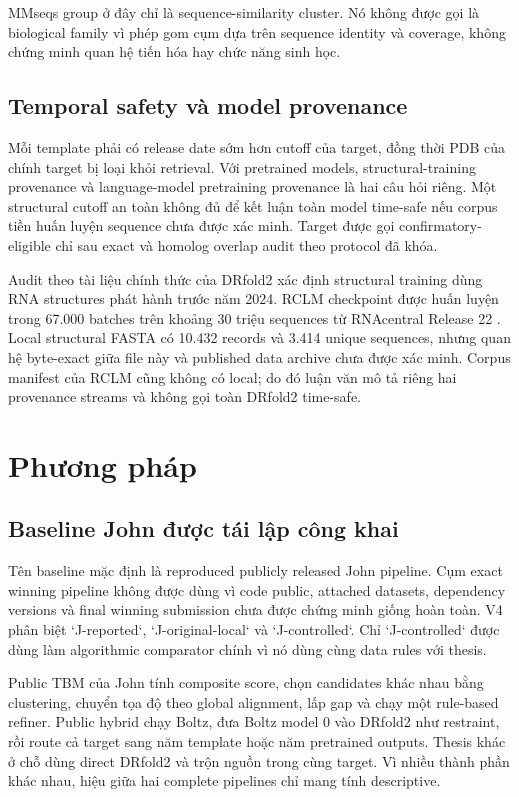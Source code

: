 \documentclass[12pt,a4paper,oneside]{report}
\begin{document}
MMseqs group ở đây chỉ là sequence-similarity cluster. Nó không được gọi là biological
family vì phép gom cụm dựa trên sequence identity và coverage, không chứng minh quan hệ
tiến hóa hay chức năng sinh học.

\section{Temporal safety và model provenance}

Mỗi template phải có release date sớm hơn cutoff của target, đồng thời PDB của chính
target bị loại khỏi retrieval. Với pretrained models, structural-training provenance
và language-model pretraining provenance là hai câu hỏi riêng. Một structural cutoff
an toàn không đủ để kết luận toàn model time-safe nếu corpus tiền huấn luyện sequence
chưa được xác minh. Target được gọi confirmatory-eligible chỉ sau exact và homolog
overlap audit theo protocol đã khóa.

Audit theo tài liệu chính thức của DRfold2 xác định structural training dùng RNA
structures phát hành trước năm 2024. RCLM checkpoint được huấn luyện trong 67.000
batches trên khoảng 30 triệu sequences từ RNAcentral Release 22 \cite{drfold2}. Local
structural FASTA có 10.432 records và 3.414 unique sequences, nhưng quan hệ byte-exact
giữa file này và published data archive chưa được xác minh. Corpus manifest của RCLM
cũng không có local; do đó luận văn mô tả riêng hai provenance streams và không gọi
toàn DRfold2 time-safe.

\chapter{Phương pháp}

\section{Baseline John được tái lập công khai}

Tên baseline mặc định là reproduced publicly released John pipeline. Cụm exact winning
pipeline không được dùng vì code public, attached datasets, dependency versions và
final winning submission chưa được chứng minh giống hoàn toàn. V4 phân biệt
`J-reported`, `J-original-local` và `J-controlled`. Chỉ `J-controlled` được dùng làm
algorithmic comparator chính vì nó dùng cùng data rules với thesis.

Public TBM của John tính composite score, chọn candidates khác nhau bằng clustering,
chuyển tọa độ theo global alignment, lấp gap và chạy một rule-based refiner. Public
hybrid chạy Boltz, đưa Boltz model 0 vào DRfold2 như restraint, rồi route cả target sang
năm template hoặc năm pretrained outputs. Thesis khác ở chỗ dùng direct DRfold2 và
trộn nguồn trong cùng target. Vì nhiều thành phần khác nhau, hiệu giữa hai complete
pipelines chỉ mang tính descriptive.
\end{document}
